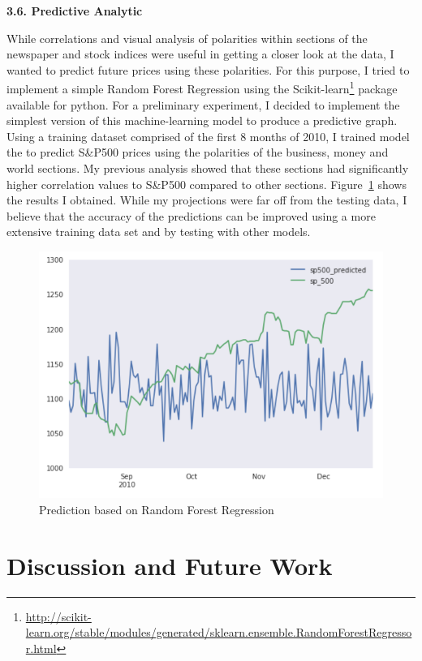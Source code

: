 \documentclass{acm_proc_article-sp}
\begin{document}
\textbf{3.6. Predictive Analytic }


While correlations and visual analysis of polarities within sections of the newspaper and stock indices were useful in getting a closer look at the data, I wanted to predict future prices using these polarities. For this purpose, I tried to implement a simple Random Forest Regression using the Scikit-learn\footnote{\url{http://scikit-learn.org/stable/modules/generated/sklearn.ensemble.RandomForestRegressor.html}} package available for python. For a preliminary experiment, I decided to implement the simplest version of this machine-learning model to produce a predictive graph. Using a training dataset comprised of the first 8 months of 2010, I trained model the to predict S&P500 prices using the polarities of the business, money and world sections. My previous analysis showed that these sections had significantly higher correlation values to S&P500 compared to other sections. Figure~\ref{fig:projection} shows the results I obtained. While my projections were far off from the testing data, I believe that the accuracy of the predictions can be improved using a more extensive training data set and by testing with other models. 

\begin{figure}[h]
\includegraphics[width=\linewidth]{figures/predictive_model.png}
\caption{Prediction based on Random Forest Regression}
\label{fig:projection}
\end{figure}


\section{Discussion and Future Work}
\end{document}

